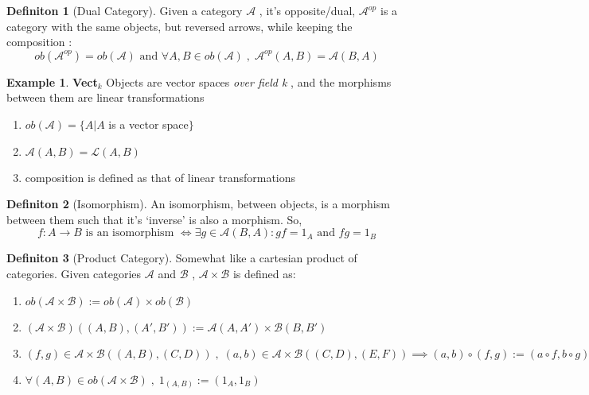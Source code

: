 \documentclass{article}
\theoremstyle{definition}
\newtheorem{example}{Example}[section]
\theoremstyle{definition}
\newtheorem{definition}{Definiton}[section]
\theoremstyle{definition}
\theoremstyle{definition}
\begin{document}
\begin{definition}[Dual Category] %
	Given a category $ \mathcal{A}  $ , it's opposite/dual, $ \mathcal{A} ^{op}  $ is a category with the same objects, but reversed arrows, while keeping the composition :
	\[ ob(\mathcal{A}^{op} ) =ob(\mathcal{A}) \text{ and } \forall A,B \in ob(\mathcal{A} )\; , \; \mathcal{A} ^{op}(A,B)=\mathcal{A} (B,A) \]
\end{definition}
\begin{example}{\textbf{Vect$ _k$ }} %
	Objects are vector spaces \textit{over field k} , and the morphisms between them are linear transformations
	\begin{enumerate}[label=\roman*]
		\item $ ob(\mathcal{A} ) = \{A | A $ is  a vector space$   \}$
		\item $ \mathcal{A} (A,B) = \mathcal{L} (A,B) $
		\item  composition is defined as that of linear transformations
	\end{enumerate}
\end{example}
\begin{definition}[Isomorphism] %
	An isomorphism, between objects, is a morphism between them such that it's `inverse' is also a morphism. So,
	\[ f: A \rightarrow B \text{ is an isomorphism } \iff \exists g \in \mathcal{A}(B,A): gf=1_A \text{ and } fg=1_B\]
\end{definition}
\begin{definition}[Product Category] %
	Somewhat like a cartesian product of categories. Given categories $ \mathcal{A}  $ and $ \mathcal{B}  $ , $ \mathcal{A}  \times \mathcal{B}  $ is defined as:
	\begin{enumerate}[label=\roman*]
		\item $ ob( \mathcal{A}  \times \mathcal{B}) := ob(\mathcal{A} ) \times ob(\mathcal{B} )$
		\item $(\mathcal{A} \times \mathcal{B})((A,B),(A',B')):=\mathcal{A} (A,A')\times\mathcal{B} (B,B') $
		\item $ (f,g) \in \mathcal{A}\times \mathcal{B} ((A,B),(C,D)) \; , \;(a,b) \in \mathcal{A}\times \mathcal{B} ((C,D),(E,F)) \implies (a,b) \circ (f,g) := (a \circ f, b \circ g)$
		\item $ \forall (A,B) \in ob(\mathcal{A}\times \mathcal{B})\; , \; 1_{(A,B)}:=(1_A,1_B) $
	\end{enumerate}
\end{definition}
\end{document}
